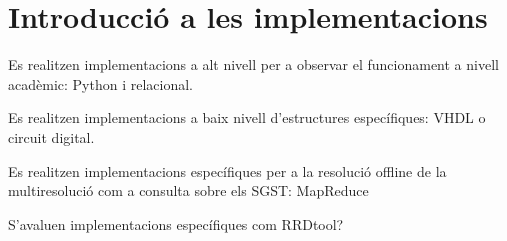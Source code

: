 

\chapter{Introducció a les implementacions}


Es realitzen implementacions a alt nivell per a observar el funcionament a nivell acadèmic: Python i relacional.



Es realitzen implementacions a baix nivell d'estructures específiques: VHDL o circuit digital.


Es realitzen implementacions específiques per a la resolució offline de la multiresolució com a consulta sobre els SGST: MapReduce


S'avaluen implementacions específiques com RRDtool?





















